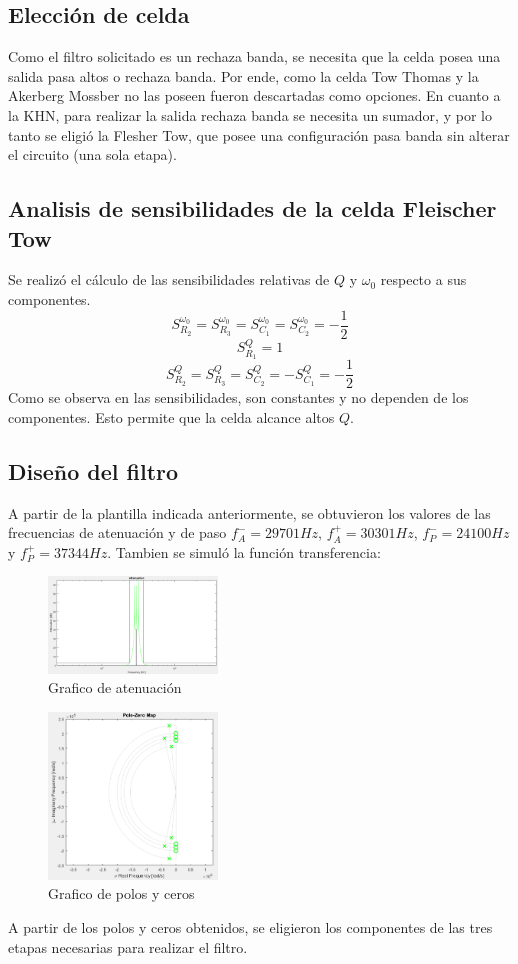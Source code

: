 \documentclass[../../tc_tp5_main.tex]{subfiles}
\begin{document}
\subsection{Elección de celda}
Como el filtro solicitado es un rechaza banda, se necesita que la celda posea una salida pasa altos o rechaza banda. Por ende, como  la celda Tow Thomas y la Akerberg Mossber no las poseen fueron descartadas como opciones. En cuanto a la KHN, para realizar la salida rechaza banda se necesita un sumador, y por lo tanto se eligió la Flesher Tow, que posee una configuración pasa banda sin alterar el circuito (una sola etapa).

\subsection{Analisis de sensibilidades de la celda Fleischer Tow}
Se realizó el c\'alculo de las sensibilidades relativas de $Q$ y $\omega_0$ respecto a sus componentes.
$$S^{\omega_0}_{R_2}=S^{\omega_0}_{R_3}=S^{\omega_0}_{C_1}=S^{\omega_0}_{C_2}=- \frac{1}{2}$$
$$S^{Q}_{R_1}= 1$$
$$S^{Q}_{R_2}=S^{Q}_{R_3}=S^{Q}_{C_2}=-S^{Q}_{C_1}=-\frac{1}{2} $$
Como se observa en las sensibilidades, son constantes y no dependen de los componentes. Esto permite que la celda alcance altos $Q$.


\subsection{Diseño del filtro}
A partir de la plantilla indicada anteriormente, se obtuvieron los valores de las frecuencias de atenuación y de paso $ f_A^-=29701Hz $, $f_A^+=30301Hz $, $ f_P^-=24100Hz $ y $ f_P^+=37344Hz $. Tambien se simuló la función transferencia:
\begin{figure}[H]	
	\centering
	\includegraphics[width=0.4\textwidth]{imagenes/atten.png}
	\caption{Grafico de atenuación}
\end{figure}
\begin{figure}[H]	
	\centering
	\includegraphics[width=0.4\textwidth]{imagenes/polezero.png}
	\caption{Grafico de polos y ceros}
\end{figure}
A partir de los polos y ceros obtenidos, se eligieron los componentes de las tres etapas necesarias para realizar el filtro.
\end{document}
